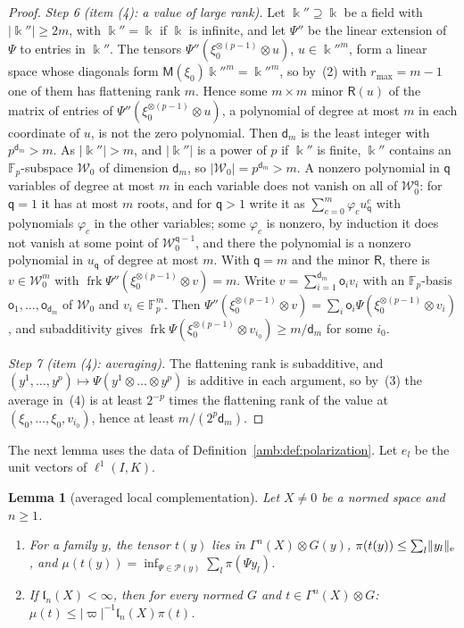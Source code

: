 \documentclass[11pt]{amsart}
\newtheorem{lemma}[theorem]{Lemma}
\theoremstyle{definition}
\theoremstyle{remark}
\numberwithin{equation}{section}
\newcommand{\F}{\mathbb F}
\newcommand{\abs}[1]{\lvert #1\rvert}
\newcommand{\norm}[1]{\lVert #1\rVert}
\theoremstyle{plain}
\theoremstyle{definition}
\theoremstyle{plain}
\begin{document}
\begin{proof}
\emph{Step 6 (item (4): a value of large rank).} Let $\Bbbk''\supseteq\Bbbk$ be a field with $\abs{\Bbbk''}\ge2m$,
with $\Bbbk''=\Bbbk$ if $\Bbbk$ is infinite, and let $\Psi''$ be the linear extension of $\Psi$ to entries in $\Bbbk''$.
The tensors $\Psi''(\xi_0^{\otimes(p-1)}\otimes u)$, $u\in\Bbbk''^m$, form a linear space whose diagonals form
$\mathsf M(\xi_0)\Bbbk''^m=\Bbbk''^m$, so by~(2) with $r_{\max}=m-1$ one of them has flattening rank $m$. Hence some $m\times m$
minor $\mathsf R(u)$ of the matrix of entries of $\Psi''(\xi_0^{\otimes(p-1)}\otimes u)$, a polynomial of degree at most
$m$ in each coordinate of $u$, is not the zero polynomial. Then $\mathsf d_m$ is the least integer with
$p^{\mathsf d_m}>m$. As $\abs{\Bbbk''}>m$, and $\abs{\Bbbk''}$ is a power of $p$ if $\Bbbk''$ is finite, $\Bbbk''$ contains an
$\F_p$\nobreakdash-subspace $\mathcal W_0$ of dimension $\mathsf d_m$, so $\abs{\mathcal W_0}=p^{\mathsf d_m}>m$. A nonzero polynomial in $\mathsf q$
variables of degree at most $m$ in each variable does not vanish on all of $\mathcal W_0^{\mathsf q}$: for $\mathsf q=1$ it has at most
$m$ roots, and for $\mathsf q>1$ write it as $\sum_{c=0}^m\varphi_cu_{\mathsf q}^c$ with polynomials $\varphi_c$ in the other variables;
some $\varphi_c$ is nonzero, by induction it does not vanish at some point of $\mathcal W_0^{\mathsf q-1}$, and there the
polynomial is a nonzero polynomial in $u_{\mathsf q}$ of degree at most $m$. With $\mathsf q=m$ and the minor $\mathsf R$, there is
$v\in\mathcal W_0^m$ with $\operatorname{frk}\Psi''(\xi_0^{\otimes(p-1)}\otimes v)=m$. Write
$v=\sum_{i=1}^{\mathsf d_m}\mathsf o_iv_i$ with an $\F_p$\nobreakdash-basis $\mathsf o_1,\dots,\mathsf o_{\mathsf d_m}$ of $\mathcal W_0$ and $v_i\in\F_p^m$.
Then $\Psi''(\xi_0^{\otimes(p-1)}\otimes v)=\sum_i\mathsf o_i\Psi(\xi_0^{\otimes(p-1)}\otimes v_i)$, and subadditivity gives
$\operatorname{frk}\Psi(\xi_0^{\otimes(p-1)}\otimes v_{i_0})\ge m/\mathsf d_m$ for some $i_0$.

\emph{Step 7 (item (4): averaging).} The flattening rank is subadditive, and
$(y^1,\dots,y^p)\mapsto\Psi(y^1\otimes\dots\otimes y^p)$ is additive in each argument, so by~(3) the average in~(4) is
at least $2^{-p}$ times the flattening rank of the value at $(\xi_0,\dots,\xi_0,v_{i_0})$, hence at least $m/(2^p\mathsf d_m)$.
\end{proof}

The next lemma uses the data of Definition~\ref{amb:def:polarization}. Let $e_l$ be the unit vectors of $\ell^1(I,K)$.

\begin{lemma}[averaged local complementation]\label{amb:lem:family}
Let $X\ne0$ be a normed space and $n\ge1$.
\begin{enumerate}
\item For a family $y$, the tensor $t(y)$ lies in $\Gamma^n(X)\otimes G(y)$, $\pi(t(y))\le\sum_l\norm{y_l}_{\rm e}$, and $\mu(t(y))=\inf_{\Psi\in\mathcal P(y)}\sum_l\pi(\Psi y_l)$.
\item If $\mathfrak l_n(X)<\infty$, then for every normed $G$ and $t\in\Gamma^n(X)\otimes G$: $\mu(t)\le\abs\varpi^{-1}\mathfrak l_n(X)\pi(t)$.
\end{enumerate}
\end{lemma}
\end{document}
